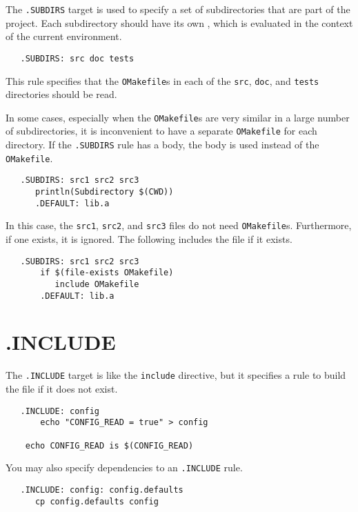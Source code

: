 The \verb+.SUBDIRS+ target is used to specify a set of subdirectories
that are part of the project.  Each subdirectory should have its own
, which is evaluated in the context of the current
environment.

\begin{verbatim}
   .SUBDIRS: src doc tests
\end{verbatim}

This rule specifies that the \verb+OMakefile+s in each of the \verb+src+, \verb+doc+, and
\verb+tests+ directories should be read.

In some cases, especially when the \verb+OMakefile+s are very similar in a large number of
subdirectories, it is inconvenient to have a separate \verb+OMakefile+ for each directory.  If the
\verb+.SUBDIRS+ rule has a body, the body is used instead of the \verb+OMakefile+.

\begin{verbatim}
   .SUBDIRS: src1 src2 src3
      println(Subdirectory $(CWD))
      .DEFAULT: lib.a
\end{verbatim}

In this case, the \verb+src1+, \verb+src2+, and \verb+src3+ files do not need \verb+OMakefile+s.
Furthermore, if one exists, it is ignored.  The following includes the file if it exists.

\begin{verbatim}
   .SUBDIRS: src1 src2 src3
       if $(file-exists OMakefile)
          include OMakefile
       .DEFAULT: lib.a
\end{verbatim}

\section{.INCLUDE}

The \verb+.INCLUDE+ target is like the \verb+include+ directive, but it specifies a rule to build
the file if it does not exist.

\begin{verbatim}
   .INCLUDE: config
       echo "CONFIG_READ = true" > config

    echo CONFIG_READ is $(CONFIG_READ)
\end{verbatim}

You may also specify dependencies to an \verb+.INCLUDE+ rule.

\begin{verbatim}
   .INCLUDE: config: config.defaults
      cp config.defaults config
\end{verbatim}

